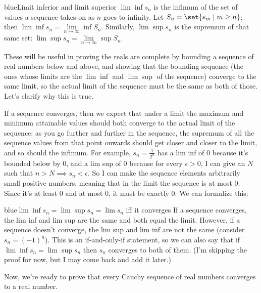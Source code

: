 \documentclass[./analysis.tex]{subfiles}
\begin{document}
    \begin{mycolorbox}{blue}{Limit inferior and limit superior} $\lim\inf s_n$ is the infimum of the set of values a sequence takes on as $n$ goes to infinity. Let $S_n = \set{s_m \mid m \geq n}$; then $\lim\inf s_n = \lim\limits_{n \to \infty} \inf S_n$. Similarly, $\lim\sup s_n$ is the supremum of that same set: $\lim\sup s_n = \lim\limits_{n \to \infty} \sup S_n$. \end{mycolorbox}

    These will be useful in proving the reals are complete by bounding a sequence of real numbers below and above, and showing that the bounding sequence (the ones whose limits are the $\lim\inf$ and $\lim\sup$ of the sequence) converge to the same limit, so the actual limit of the sequence must be the same as both of those. Let's clarify why this is true.
 
    If a sequence converges, then we expect that under a limit the maximum and minimum attainable values should both converge to the actual limit of the sequence: as you go further and further in the sequence, the supremum of all the sequence values from that point onwards should get closer and closer to the limit, and so should the infimum. For example, $s_n = \frac{1}{2^n}$ has a lim inf of $0$ because it's bounded below by 0, and a lim sup of 0 because for every $\epsilon > 0$, I can give an $N$ such that $n > N \implies s_n < \epsilon$. So I can make the sequence elements arbitrarily small positive numbers, meaning that in the limit the sequence is at most 0. Since it's at least 0 and at most 0, it must be exactly 0. We can formalize this:

    \begin{mycolorbox}{blue}{$\lim\inf s_n = \lim\sup s_n = \lim s_n$ iff it converges}  If a sequence converges, the lim inf and lim sup are the same and both equal the limit. However, if a sequence doesn't converge, the lim sup and lim inf are not the same (consider $s_n = (-1)^n$). This is an if-and-only-if statement, so we can also say that if $\lim\inf s_n = \lim\sup s_n$ then $s_n$ converges to both of them. (I'm skipping the proof for now, but I may come back and add it later.) \end{mycolorbox}

    Now, we're ready to prove that every Cauchy sequence of real numbers converges to a real number.
\end{document}

